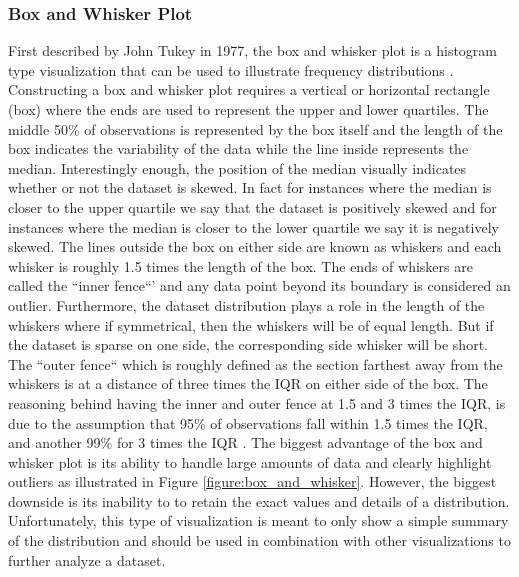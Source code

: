 \subsubsection{Box and Whisker Plot}
First described by John Tukey in 1977, the box and whisker plot is a histogram
type visualization that can be used to illustrate frequency distributions \cite{c10}. Constructing
a box and whisker plot requires a vertical or horizontal rectangle (box) where the 
ends are used to represent the upper and lower quartiles. The middle 50\% of observations 
is represented by the box itself and the length of the box indicates the variability 
of the data while the line inside represents the median. Interestingly enough, 
the position of the median visually indicates whether or not the dataset is skewed. 
In fact for instances where the median is closer to the upper quartile we say that 
the dataset is positively skewed and for instances where the median is closer to 
the lower quartile we say it is negatively skewed. 
The lines outside the box on either side are known as whiskers and each whisker 
is roughly 1.5 times the length of the box. The ends of whiskers are called the 
``inner fence``' and any data point beyond its boundary is considered an outlier. 
Furthermore, the dataset distribution plays a role in the length of the whiskers 
where if symmetrical, then the whiskers will be of equal length. But if the dataset 
is sparse on one side, the corresponding side whisker will be short. The ``outer fence``
which is roughly defined as the section farthest away from the whiskers is at a 
distance of three times the IQR on either side of the box. The reasoning behind 
having the inner and outer fence at 1.5 and 3 times the IQR, is due to the assumption 
that 95\% of observations fall within 1.5 times the IQR, and another 99\% for 3 
times the IQR \cite{c10}. The biggest advantage of the box and whisker plot is its ability 
to handle large amounts of data and clearly highlight outliers as illustrated in 
Figure \ref{figure:box_and_whisker}. However, the biggest downside is its inability to
to retain the exact values and details of a distribution. Unfortunately, this type
of visualization is meant to only show a simple summary of the distribution and
should be used in combination with other visualizations to further analyze a dataset.

